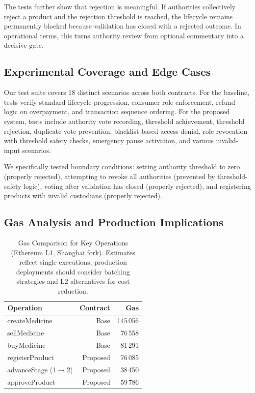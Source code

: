 \documentclass[conference]{IEEEtran}
\begin{document}
The tests further show that rejection is meaningful. If authorities collectively reject a product and the rejection threshold is reached, the lifecycle remains permanently blocked because validation has closed with a rejected outcome. In operational terms, this turns authority review from optional commentary into a decisive gate.

\subsection{Experimental Coverage and Edge Cases}

Our test suite covers 18 distinct scenarios across both contracts. For the baseline, tests verify standard lifecycle progression, consumer role enforcement, refund logic on overpayment, and transaction sequence ordering. For the proposed system, tests include authority vote recording, threshold achievement, threshold rejection, duplicate vote prevention, blacklist-based access denial, role revocation with threshold safety checks, emergency pause activation, and various invalid-input scenarios.

We specifically tested boundary conditions: setting authority threshold to zero (properly rejected), attempting to revoke all authorities (prevented by threshold-safety logic), voting after validation has closed (properly rejected), and registering products with invalid custodians (properly rejected).

\subsection{Gas Analysis and Production Implications}

\begin{table}[htbp]
\caption{Gas Comparison for Key Operations (Ethereum L1, Shanghai fork). Estimates reflect single executions; production deployments should consider batching strategies and L2 alternatives for cost reduction.}
\begin{center}
\begin{tabular}{lrr}
\toprule
\textbf{Operation} & \textbf{Contract} & \textbf{Gas} \\
\midrule
createMedicine & Base & 145\,056 \\
sellMedicine & Base & 76\,558 \\
buyMedicine & Base & 81\,291 \\
registerProduct & Proposed & 76\,085 \\
advanceStage (1$\to$2) & Proposed & 38\,450 \\
approveProduct & Proposed & 59\,786 \\
\bottomrule
\end{tabular}
\label{tab:gas}
\end{center}
\end{table}
\end{document}
